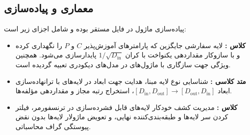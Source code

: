 \subsection{معماری و پیاده‌سازی}
پیاده‌سازی ماژول در فایل  مستقر بوده و شامل اجزای زیر است:
\begin{itemize}
    \item \textbf{کلاس :} لایه سفارشی جایگزین  که پارامترهای آموزش‌پذیر $C$ و $P$ را نگهداری کرده و با سازوکار مقداردهی یکنواخت با کران $1/\sqrt{D_{\text{in}}}$ پایدارسازی می‌شود. همچنین ویژگی  جهت سازگاری با ماژول‌های  در مدل‌های دیکودری تعبیه گردیده است.
    \item \textbf{متد کلاسی :} شناسایی نوع لایه مبنا، هدایت جهت ابعاد در لایه‌های  با ترانهاده‌سازی ابعاد $[D_{\text{in}}, D_{\text{out}}] \to [D_{\text{out}}, D_{\text{in}}]$، استخراج رتبه مجاز و مقداردهی مؤلفه‌ها.
    \item \textbf{کلاس :} مدیریت کشف خودکار لایه‌های قابل فشرده‌سازی در ترنسفورمر، فیلتر کردن سر لایه‌ها و طبقه‌بندی‌کننده نهایی، و تعویض ماژولار لایه‌ها بدون نقض پیوستگی گراف محاسباتی.
\end{itemize}
